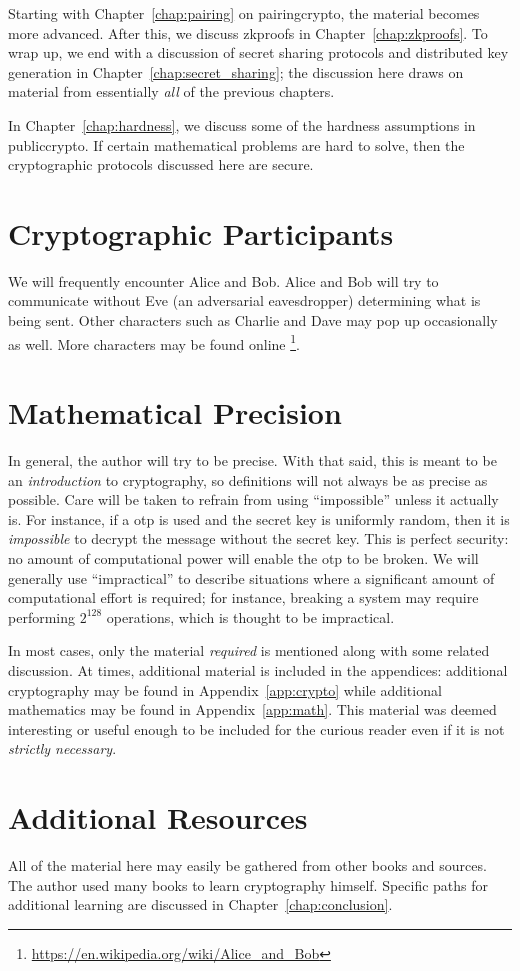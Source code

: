 Starting with Chapter~\ref{chap:pairing} on \gls{pairingcrypto},
the material becomes more advanced.
After this, we discuss \glspl{zkproof} in Chapter~\ref{chap:zkproofs}.
To wrap up, we end with a discussion of secret sharing protocols
and \gls{distributed key generation} in Chapter~\ref{chap:secret_sharing};
the discussion here draws on material from essentially \emph{all}
of the previous chapters.

In Chapter~\ref{chap:hardness}, we discuss some of the hardness assumptions
in \gls{publiccrypto}.
If certain mathematical problems are hard to solve,
then the cryptographic protocols discussed here are secure.



\section{Cryptographic Participants}

We will frequently encounter Alice and Bob.
Alice and Bob will try to communicate without Eve
(an adversarial eavesdropper) determining what is being sent.
Other characters such as Charlie and Dave may pop up occasionally as well.
More characters may be found online%
\footnote{\url{https://en.wikipedia.org/wiki/Alice_and_Bob}}.



\section{Mathematical Precision}

In general, the author will try to be precise.
With that said, this is meant to be an \emph{introduction} to cryptography,
so definitions will not always be as precise as possible.
Care will be taken to refrain from using ``impossible''
unless it actually is.
For instance, if a \gls{otp} is used and the secret key is
uniformly random, then it is \emph{impossible} to decrypt the message
without the secret key.
This is \gls{perfect security}: no amount of computational power will enable
the \gls{otp} to be broken.
We will generally use ``impractical'' to describe situations
where a significant amount of computational effort is required;
for instance, breaking a system may require performing $2^{128}$
operations, which is thought to be impractical.

In most cases, only the material \emph{required} is mentioned
along with some related discussion.
At times, additional material is included in the appendices:
additional cryptography may be found in Appendix~\ref{app:crypto}
while additional mathematics may be found in Appendix~\ref{app:math}.
This material was deemed interesting or useful enough
to be included for the curious reader even if it is not
\emph{strictly necessary}.



\section{Additional Resources}

All of the material here may easily be gathered from other books and sources.
The author used many books to learn cryptography himself.
Specific paths for additional learning are discussed
in Chapter~\ref{chap:conclusion}.
